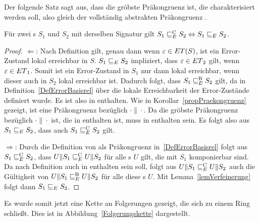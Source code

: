 Der folgende Satz sagt aus, dass \ERel{} die gröbste Präkongruenz ist, die
charakterisiert werden soll, also gleich der vollständig abstrakten
Präkongruenz \ECRel{}.

\begin{satz}
\label{satzFullAbstractness}
Für zwei \EIO{}s $S_1$ und $S_2$ mit derselben Signatur gilt
$S_1\sqsubseteq _E^\mathrm{C} S_2\Leftrightarrow S_1\sqsubseteq _E S_2$.
\end{satz}

\begin{proof}
  \glqq{}$\Leftarrow$\grqq{}: Nach Definition gilt, genau dann wenn
      $\varepsilon\in ET{}(S)$, ist ein Error-Zustand lokal erreichbar in $S$.
      $S_1\sqsubseteq _E S_2$ impliziert, dass $\varepsilon\in
      ET{}_2$ gilt, wenn $\varepsilon\in ET{}_1$. Somit ist ein Error-Zustand
      in $S_1$ nur dann lokal erreichbar, wenn dieser auch in $S_2$ lokal
      erreichbar ist. Dadurch folgt, dass $S_1\sqsubseteq _E^\mathrm{B} S_2$ gilt, da \EBRel{} in
      Definition~\ref{DefErrorBasisrel} über die lokale Erreichbarkeit der
      Error-Zustände definiert wurde. Es ist also \ERel{} in \EBRel{} enthalten.
      Wie in Korollar~\ref{propPraekongruenz} gezeigt, ist \ERel{} eine
      Präkongruenz bezüglich $\cdot\|\cdot$. Da \ECRel{} die gröbste Präkongruenz bezüglich
      $\cdot\|\cdot$ ist, die in \EBRel{} enthalten ist, muss \ERel{} in
      \ECRel{} enthalten sein. Es folgt also aus $S_1\sqsubseteq _E S_2$, dass auch
      $S_1\sqsubseteq _E^\mathrm{C}{} S_2$ gilt.

      \glqq{}$\Rightarrow$\grqq{}: Durch die Definition von \ECRel{} als
      Präkongruenz in~\ref{DefErrorBasisrel} folgt aus $S_1\sqsubseteq _E^\mathrm{C} S_2$, dass
      $U\|S_1\sqsubseteq _E^\mathrm{C} U\|S_2$ für alle \EIO{}s $U$ gilt, die mit $S_1$ komponierbar
      sind. Da \ECRel{} nach Definition auch in \EBRel{} enthalten sein soll,
      folgt aus $U\|S_1\sqsubseteq _E^\mathrm{C} U\|S_2$ auch die Gültigkeit von $U\|S_1\sqsubseteq _E^\mathrm{B}
      U\|S_2$ für alle diese \EIO{}s $U$. Mit Lemma~\ref{lemVerfeinerung} folgt
      dann $S_1\sqsubseteq _E S_2$.
\end{proof}

Es wurde somit jetzt eine Kette an Folgerungen gezeigt, die sich zu einem
Ring schließt. Dies ist in Abbildung~\ref{Folgerungskette} dargestellt.

